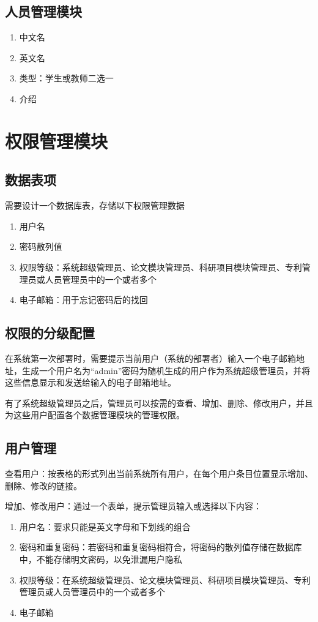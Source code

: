 \subsection{人员管理模块}

\begin{enumerate}
\item 中文名
\item 英文名
\item 类型：学生或教师二选一
\item 介绍
\end{enumerate}

\section{权限管理模块}
\subsection{数据表项}
需要设计一个数据库表，存储以下权限管理数据

\begin{enumerate}
\item 用户名
\item 密码散列值
\item 权限等级：系统超级管理员、论文模块管理员、科研项目模块管理员、专利管理员或人员管理员中的一个或者多个
\item 电子邮箱：用于忘记密码后的找回
\end{enumerate}

\subsection{权限的分级配置}

在系统第一次部署时，需要提示当前用户（系统的部署者）输入一个电子邮箱地址，生成一个用户名为“admin”密码为随机生成的用户作为系统超级管理员，并将这些信息显示和发送给输入的电子邮箱地址。

有了系统超级管理员之后，管理员可以按需的查看、增加、删除、修改用户，并且为这些用户配置各个数据管理模块的管理权限。

\subsection{用户管理}

查看用户：按表格的形式列出当前系统所有用户，在每个用户条目位置显示增加、删除、修改的链接。

增加、修改用户：通过一个表单，提示管理员输入或选择以下内容：

\begin{enumerate}
\item 用户名：要求只能是英文字母和下划线的组合
\item 密码和重复密码：若密码和重复密码相符合，将密码的散列值存储在数据库中，不能存储明文密码，以免泄漏用户隐私
\item 权限等级：在系统超级管理员、论文模块管理员、科研项目模块管理员、专利管理员或人员管理员中的一个或者多个
\item 电子邮箱
\end{enumerate}

